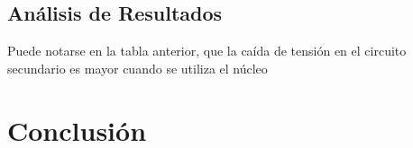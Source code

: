 \documentclass[a4paper,12pt]{article}
\begin{document}
\subsection{Análisis de Resultados}
\hspace{1cm} Puede notarse en la tabla anterior, que la caída de tensión en el circuito secundario es mayor cuando se utiliza 
el núcleo


\section{Conclusión}
\end{document}
